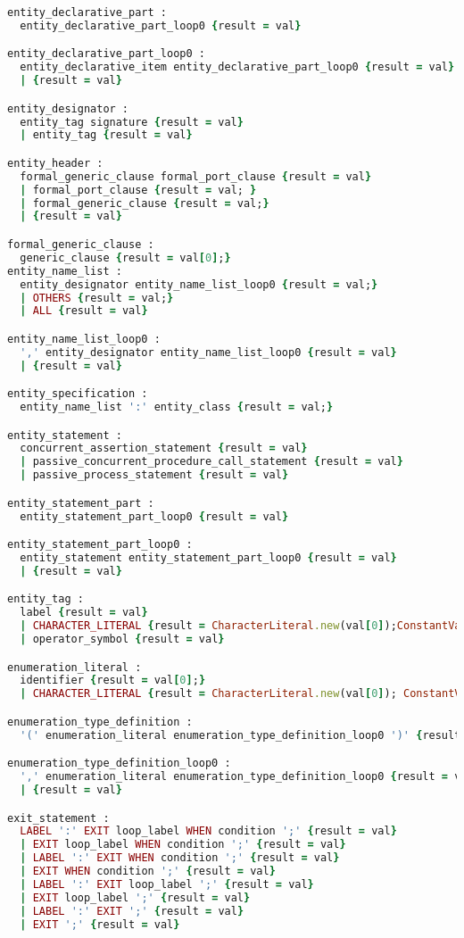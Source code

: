 \begin{lstlisting}[language=Ruby, style=rubystyle]
entity_declarative_part :
  entity_declarative_part_loop0 {result = val}

entity_declarative_part_loop0 :
  entity_declarative_item entity_declarative_part_loop0 {result = val}
  | {result = val}

entity_designator :
  entity_tag signature {result = val}
  | entity_tag {result = val}

entity_header :
  formal_generic_clause formal_port_clause {result = val}
  | formal_port_clause {result = val; }
  | formal_generic_clause {result = val;}
  | {result = val}

formal_generic_clause :
  generic_clause {result = val[0];}
entity_name_list :
  entity_designator entity_name_list_loop0 {result = val;}
  | OTHERS {result = val;}
  | ALL {result = val}

entity_name_list_loop0 :
  ',' entity_designator entity_name_list_loop0 {result = val}
  | {result = val}

entity_specification :
  entity_name_list ':' entity_class {result = val;}

entity_statement :
  concurrent_assertion_statement {result = val}
  | passive_concurrent_procedure_call_statement {result = val}
  | passive_process_statement {result = val}

entity_statement_part :
  entity_statement_part_loop0 {result = val}

entity_statement_part_loop0 :
  entity_statement entity_statement_part_loop0 {result = val}
  | {result = val}

entity_tag :
  label {result = val}
  | CHARACTER_LITERAL {result = CharacterLiteral.new(val[0]);ConstantValueRepository.add(result);}
  | operator_symbol {result = val}

enumeration_literal :
  identifier {result = val[0];}
  | CHARACTER_LITERAL {result = CharacterLiteral.new(val[0]); ConstantValueRepository.add(result); }

enumeration_type_definition :
  '(' enumeration_literal enumeration_type_definition_loop0 ')' {result = val}

enumeration_type_definition_loop0 :
  ',' enumeration_literal enumeration_type_definition_loop0 {result = val}
  | {result = val}

exit_statement :
  LABEL ':' EXIT loop_label WHEN condition ';' {result = val}
  | EXIT loop_label WHEN condition ';' {result = val}
  | LABEL ':' EXIT WHEN condition ';' {result = val}
  | EXIT WHEN condition ';' {result = val}
  | LABEL ':' EXIT loop_label ';' {result = val}
  | EXIT loop_label ';' {result = val}
  | LABEL ':' EXIT ';' {result = val}
  | EXIT ';' {result = val}


\end{lstlisting}
